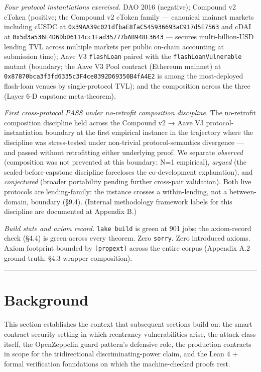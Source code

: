 \emph{Four protocol instantiations exercised.} DAO 2016 (negative);
Compound v2 cToken (positive; the Compound v2 cToken family ---
canonical mainnet markets including cUSDC at
\texttt{0x39AA39c021dfbaE8faC545936693aC917d5E7563} and cDAI at
\texttt{0x5d3a536E4D6DbD6114cc1Ead35777bAB948E3643} --- secures
multi-billion-USD lending TVL across multiple markets per public
on-chain accounting at submission time); Aave V3 \texttt{flashLoan}
paired with the \texttt{flashLoanVulnerable} mutant (boundary; the Aave
V3 Pool contract (Ethereum mainnet) at
\texttt{0x87870bca3f3fd6335c3F4ce8392D69350B4fA4E2} is among the
most-deployed flash-loan venues by single-protocol TVL); and the
composition across the three (Layer 6-D capstone meta-theorem).

\emph{First cross-protocol PASS under no-retrofit composition
discipline.} The no-retrofit composition discipline held across the
Compound v2 → Aave V3 protocol-instantiation boundary at the first
empirical instance in the trajectory where the discipline was
stress-tested under non-trivial protocol-semantics divergence --- and
passed without retrofitting either underlying proof. We separate
\emph{observed} (composition was not prevented at this boundary; N=1
empirical), \emph{argued} (the sealed-before-capstone discipline
forecloses the co-development explanation), and \emph{conjectured}
(broader portability pending further cross-pair validation). Both live
protocols are lending-family: the instance crosses a within-lending, not
a between-domain, boundary (§9.4). (Internal methodology framework
labels for this discipline are documented at Appendix B.)

\emph{Build state and axiom record.} \texttt{lake\ build} is green at
901 jobs; the axiom-record check (§4.4) is green across every theorem.
Zero \texttt{sorry}. Zero introduced axioms. Axiom footprint bounded by
\texttt{{[}propext{]}} across the entire corpus (Appendix A.2 ground
truth; §4.3 wrapper composition).

\begin{center}\rule{0.5\linewidth}{0.5pt}\end{center}

\section{Background}\label{background}

This section establishes the context that subsequent sections build on:
the smart contract security setting in which reentrancy vulnerabilities
arise, the attack class itself, the OpenZeppelin guard pattern's
defensive role, the production contracts in scope for the tridirectional
discriminating-power claim, and the Lean 4 + formal verification
foundations on which the machine-checked proofs rest.

